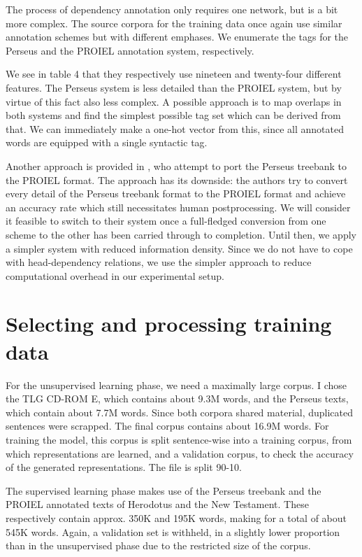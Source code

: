 The process of dependency annotation only requires one network, but is
a bit more complex. The source corpora for the training data once
again use similar annotation schemes but with different emphases. We
enumerate the tags for the Perseus and the PROIEL annotation system,
respectively.

We see in table 4 that they respectively use nineteen and twenty-four
different features. The Perseus system is less detailed than the
PROIEL system, but by virtue of this fact also less complex. A
possible approach is to map overlaps in both systems and find the
simplest possible tag set which can be derived from that. We can
immediately make a one-hot vector from this, since all annotated words
are equipped with a single syntactic tag. 

Another approach is provided in \cite{conf/lrec/LeeH10}, who attempt
to port the Perseus treebank to the PROIEL format. The approach has
its downside: the authors try to convert every detail of the Perseus
treebank format to the PROIEL format and achieve an accuracy rate
which still necessitates human postprocessing. We will consider it
feasible to switch to their system once a full-fledged conversion from
one scheme to the other has been carried through to completion. Until
then, we apply a simpler system with reduced information
density. Since we do not have to cope with head-dependency relations,
we use the simpler approach to reduce computational overhead in our
experimental setup.

\section{Selecting and processing training data}
\label{sec:trainingdata}

For the unsupervised learning phase, we need a maximally large
corpus. I chose the TLG CD-ROM E, which contains about 9.3M words, and
the Perseus texts, which contain about 7.7M words. Since both corpora
shared material, duplicated sentences were scrapped. The final corpus
contains about 16.9M words. For training the model, this corpus is
split sentence-wise into a training corpus, from which representations
are learned, and a validation corpus, to check the accuracy of the
generated representations. The file is split 90-10.

The supervised learning phase makes use of the Perseus treebank and
the PROIEL annotated texts of Herodotus and the New Testament. These
respectively contain approx. 350K and 195K words, making for a total
of about 545K words. Again, a validation set is withheld, in a
slightly lower proportion than in the unsupervised phase due to the
restricted size of the corpus.

